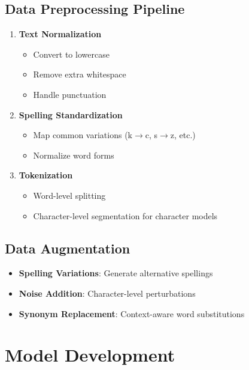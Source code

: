 \documentclass[10pt,twocolumn]{article}
\begin{document}
\subsection{Data Preprocessing Pipeline}
\begin{enumerate}[label=\arabic*.]
    \item \textbf{Text Normalization}
    \begin{itemize}[leftmargin=*,noitemsep,topsep=0pt,parsep=0pt,partopsep=0pt]
        \item Convert to lowercase
        \item Remove extra whitespace
        \item Handle punctuation
    \end{itemize}

    \item \textbf{Spelling Standardization}
    \begin{itemize}[leftmargin=*,noitemsep,topsep=0pt,parsep=0pt,partopsep=0pt]
        \item Map common variations (k$\rightarrow$c, s$\rightarrow$z, etc.)
        \item Normalize word forms
    \end{itemize}

    \item \textbf{Tokenization}
    \begin{itemize}[leftmargin=*,noitemsep,topsep=0pt,parsep=0pt,partopsep=0pt]
        \item Word-level splitting
        \item Character-level segmentation for character models
    \end{itemize}
\end{enumerate}

\subsection{Data Augmentation}
\begin{itemize}[leftmargin=*,noitemsep,topsep=0pt,parsep=0pt,partopsep=0pt]
    \item \textbf{Spelling Variations}: Generate alternative spellings
    \item \textbf{Noise Addition}: Character-level perturbations
    \item \textbf{Synonym Replacement}: Context-aware word substitutions
\end{itemize}

\section{Model Development}
\end{document}
